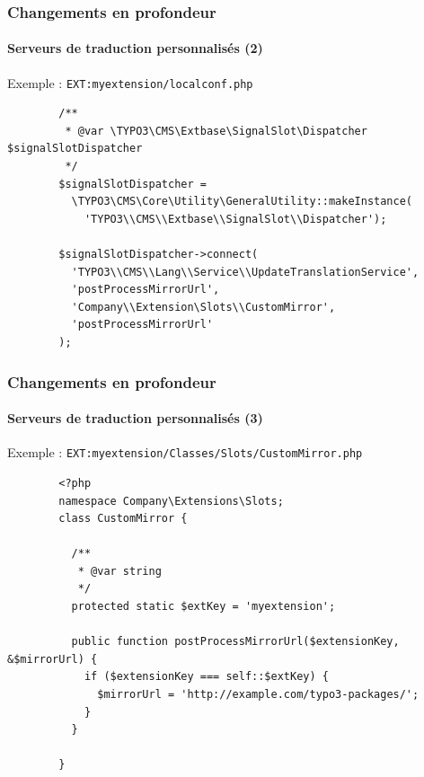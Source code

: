 
\begin{frame}[fragile]
	\frametitle{Changements en profondeur}
	\framesubtitle{Serveurs de traduction personnalisés (2)}

	Exemple : \texttt{EXT:myextension/localconf.php}

	\lstset{
		basicstyle=\tiny\ttfamily
	}

	\begin{lstlisting}
		/**
		 * @var \TYPO3\CMS\Extbase\SignalSlot\Dispatcher $signalSlotDispatcher
		 */
		$signalSlotDispatcher =
		  \TYPO3\CMS\Core\Utility\GeneralUtility::makeInstance(
		    'TYPO3\\CMS\\Extbase\\SignalSlot\\Dispatcher');

		$signalSlotDispatcher->connect(
		  'TYPO3\\CMS\\Lang\\Service\\UpdateTranslationService',
		  'postProcessMirrorUrl',
		  'Company\\Extension\Slots\\CustomMirror',
		  'postProcessMirrorUrl'
		);
	\end{lstlisting}

\end{frame}


\begin{frame}[fragile]
	\frametitle{Changements en profondeur}
	\framesubtitle{Serveurs de traduction personnalisés (3)}

	Exemple : \texttt{EXT:myextension/Classes/Slots/CustomMirror.php}

	\lstset{
		basicstyle=\tiny\ttfamily
	}

	\begin{lstlisting}
		<?php
		namespace Company\Extensions\Slots;
		class CustomMirror {

		  /**
		   * @var string
		   */
		  protected static $extKey = 'myextension';

		  public function postProcessMirrorUrl($extensionKey, &$mirrorUrl) {
		    if ($extensionKey === self::$extKey) {
		      $mirrorUrl = 'http://example.com/typo3-packages/';
		    }
		  }

		}
	\end{lstlisting}

\end{frame}

